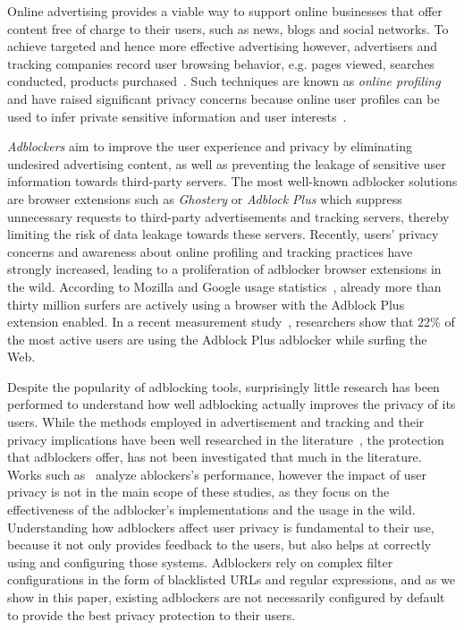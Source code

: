 \documentclass[compsoc, conference, letterpaper, 10pt, times]{IEEEtran}
\begin{document}
Online advertising provides a viable way to support online businesses that offer content free of charge to their users, such as news, blogs and social networks. To achieve targeted and hence more effective advertising however, advertisers and tracking companies record user browsing behavior, e.g. pages viewed, searches conducted, products purchased~\cite{mayer,barford, krishnamurthy_privacy_diffusion, soltani, Gill13}. Such techniques are known as \textit{online profiling} and have raised significant privacy concerns because online user profiles can be used to infer private sensitive information and user interests~\cite{castelluccia, mikians, datta, libert2015exposing}. 

\emph{Adblockers} aim to improve the user experience and privacy by eliminating undesired advertising content, as well as preventing the leakage of sensitive user information towards third-party servers. The most well-known adblocker solutions are browser extensions such as \emph{Ghostery} or \emph{Adblock Plus} which suppress unnecessary requests to third-party advertisements and tracking servers, thereby limiting the risk of data leakage towards these servers. Recently, users' privacy concerns and awareness about online profiling and tracking practices have strongly increased, leading to a proliferation of adblocker browser extensions in the wild. According to Mozilla and Google usage statistics~\cite{Mozilla_statistics,Google_statistics}, already more than thirty million surfers are actively using a browser with the Adblock Plus extension enabled. In a recent measurement  study~\cite{pujol}, researchers show that 22\% of the most active users are using the Adblock Plus adblocker while surfing the Web. 

Despite the popularity of adblocking tools, surprisingly little research has been performed to  understand how well adblocking actually improves the privacy of its users. While the methods employed in advertisement and tracking and their privacy implications have been well researched in the literature~\cite{krishnamurthy_measuring_privacy_loss, leon, englehardt,nikiforakis}, the protection that adblockers offer, has not been investigated that much in the literature. Works such as~\cite{pujol, butkiewicz, ruffel2015, kontaxis} analyze ablockers's performance, however the impact of user privacy is not in the main scope of these studies, as they focus on the effectiveness of the adblocker's implementations and the usage in the wild.
Understanding how adblockers affect user privacy is fundamental to their use, because it not only provides feedback to the users, but also helps at correctly using and configuring those systems. Adblockers rely on complex filter configurations in the form of blacklisted URLs and regular expressions, and as we show in this paper, existing adblockers are not necessarily configured by default to provide the best privacy protection to their users.
\end{document}
